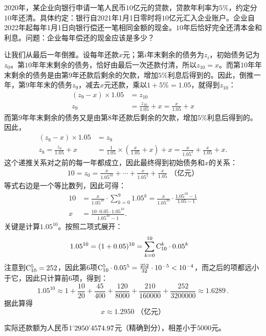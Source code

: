 \documentclass[12pt,UTF8,fontset=none]{ctexbook}
\begin{document}
\begin{et}
    2020年，某企业向银行申请一笔人民币$10$亿元的贷款，贷款年利率为$5\%$，约定分$10$年还清。具体约定：银行自2021年1月1日零时将$10$亿元汇入企业账户。企业自2022年起每年1月1日向银行偿还一笔相同金额的现金。$10$年后恰好完全还清本金和利息。问题：企业每年偿还的现金应该是多少？
\end{et}
\begin{so}
    让我们从最后一年倒推。设每年还款$x$元；第$i$年末剩余的债务为$z_i$，初始债务记为$z_0$。第$10$年年末剩余的债务，恰好由最后一次还款付清，所以$z_{10} = x$。而第$10$年年末剩余的债务是由第$9$年还款后剩余的欠款，增加$5\%$利息后得到的。因此，倒推一年，第$9$年年末的债务$z_9$，减去$x$元还款，乘以$1+5\%=1.05$，就得到$z_{10}$：
    \begin{align*}
        (z_9 - x) \times 1.05 &= z_{10} \\
        z_9 &= \frac{z_{10}}{1.05} + x = \frac{x}{1.05} + x
    \end{align*}
    而第$9$年年末剩余的债务又是由第$8$年还款后剩余的欠款，增加$5\%$利息后得到的。因此，
    \begin{align*}
        (z_8 - x) \times 1.05 &= z_{9} \\
        z_8 = \frac{z_9}{1.05} + x &= \frac{1}{1.05} \times \left(\frac{x}{1.05} + x\right) + x = \frac{x}{1.05^2} + \frac{x}{1.05} + x.
    \end{align*}
    这个递推关系对之前的每一年都成立，因此最终得到初始债务和$x$的关系：
    \begin{align*}
        10 = z_0 = \frac{x}{1.05^{10}} + \cdots + \frac{x}{1.05^2} + \frac{x}{1.05} \,\,\mbox{（亿元）} \tag{注意：最初不需要还钱}
    \end{align*}
    等式右边是一个等比数列，因此可得：
    \begin{align*}
        10 &= \frac{x}{1.05^{10}}\cdot \sum_{k=0}^{9} 1.05^k = \frac{x}{1.05^{10}}\cdot \frac{1.05^{10} - 1}{1.05 - 1} \\
        x &= \frac{10\cdot 0.05 \cdot 1.05^{10}}{1.05^{10} - 1} .
    \end{align*}
    关键是计算$1.05^{10}$。按照二项式展开：
    \begin{align*}
        1.05^{10} &= (1 + 0.05)^{10} = \sum_{k=0}^{10} \mathrm{C}_{10}^{k}\cdot 0.05^{k}
    \end{align*}
    注意到$\mathrm{C}_{10}^{5} = 252$，因此第$6$项$\mathrm{C}_{10}^{5}\cdot 0.05^5 = \frac{252}{32} \cdot 10^{-5} < 10^{-4}$，而之后的项都远小于它，因此只计算前$6$项，得到：
    $$ 1.05^{10} \approx 1 + \frac{10}{20} + \frac{45}{400} + \frac{120}{8000} + \frac{210}{160000} + \frac{252}{3200000} \approx 1.6289\, .$$
    据此算得
    $$ x \approx 1.2950\,\,\mbox{（亿元）}$$
\end{so}
实际还款额为人民币$1\dlim{2950}\dlim{4574}.97$元（精确到分），相差小于$5000$元。
\end{document}
